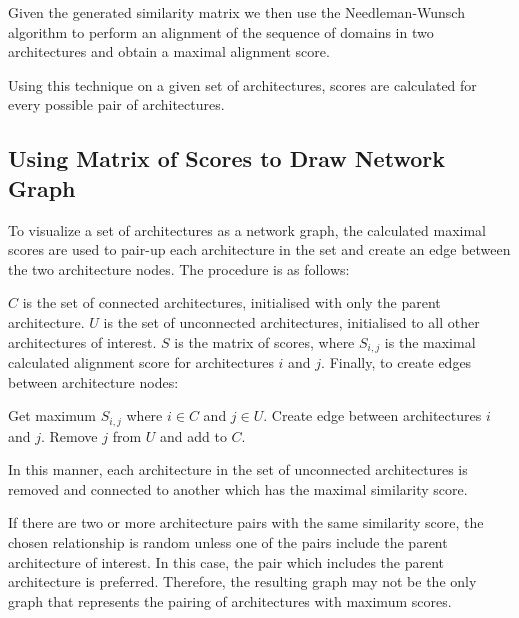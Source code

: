 Given the generated similarity matrix we then use the Needleman-Wunsch algorithm \cite{nwalgo} to perform an alignment of the sequence of domains in two architectures and obtain a maximal alignment score.

Using this technique on a given set of architectures, scores are calculated for every possible pair of architectures.


\subsection{Using Matrix of Scores to Draw Network Graph}

To visualize a set of architectures as a network graph, the calculated maximal scores are used to pair-up each architecture in the set and create an edge between the two architecture nodes. The procedure is as follows:

$C$ is the set of connected architectures, initialised with only the parent architecture. $U$ is the set of unconnected architectures, initialised to all other architectures of interest. $S$ is the matrix of scores, where $S_{i,j}$ is the maximal calculated alignment score for architectures $i$ and $j$. Finally, to create edges between architecture nodes:
\begin{algorithmic}
\STATE Get maximum $S_{i,j}$ where $i \in C$ and $j \in U$.
\STATE Create edge between architectures $i$ and $j$.
\STATE Remove $j$ from $U$ and add to $C$.
\ENDWHILE
\end{algorithmic}
In this manner, each architecture in the set of unconnected architectures is removed and connected to another which has the maximal similarity score.

If there are two or more architecture pairs with the same similarity score, the chosen relationship is random unless one of the pairs include the parent architecture of interest. In this case, the pair which includes the parent architecture is preferred. Therefore, the resulting graph may not be the only graph that represents the pairing of architectures with maximum scores. 






